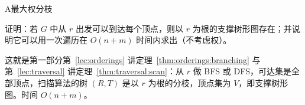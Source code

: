 \begin{exercises}{A}{最大权分枝}
\item\label{ex:branchings:A3} 证明：若 $G$ 中从 $r$ 出发可以到达每个顶点，则以 $r$ 为根的支撑树形图存在；并说明它可以用一次遍历在 $O(n+m)$ 时间内求出（不考虑权）。
\begin{solution}
这就是第一部分第~\ref{lec:orderings} 讲定理~\ref{thm:orderings:branching} 与第~\ref{lec:traversal} 讲定理~\ref{thm:traversal:scan}：从 $r$ 做 BFS 或 DFS，可达集是全部顶点，扫描算法的树 $(R,T)$ 是以 $r$ 为根的分枝，顶点集为 $V$，即支撑树形图。时间 $O(n+m)$。
\end{solution}
\end{exercises}
